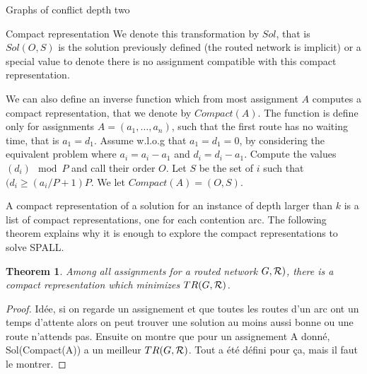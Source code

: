 \documentclass[10pt]{article}
\newtheorem{theorem}{Theorem}
\newcommand\spall{\textsc{SPALL}\xspace}
\begin{document}
\begin{section}{Graphs of conflict depth two}
\begin{subsection}{Compact representation}
We denote this transformation by $Sol$, that is $Sol(O,S)$ is the solution previously defined
(the routed network is implicit) or a special value to denote there is no assignment compatible with this compact representation. 

We can also define an inverse function which from most assignment $A$ computes a compact representation, that we denote by $Compact(A)$. The function is define only for
assignments $A = (a_1,\dots,a_n)$, such that the first route has no waiting time, that is $a_1 = d_1$. Assume w.l.o.g that $a_1 = d_1 = 0$, by considering the equivalent problem where $a_i= a_i -a_1$ and $d_i = d_i - a_1$.
Compute the values $(d_i)\mod P$ and  call their order $O$. Let 
 $S$ be the set of $i$ such that $(d_i \geq (a_i / P + 1) P$. We let $Compact(A) = (O,S)$.


A compact representation of a solution for an instance of depth larger than $k$
is a list of compact representations, one for each contention arc. The following theorem explains why it is enough to explore the compact representations to solve \spall.

\begin{theorem}
Among all assignments for a routed network $G,{\cal R})$, there is a compact representation which minimizes $TR(G,{\cal R})$.
\end{theorem}
\begin{proof}
Idée, si on regarde un assignement et que toutes les routes d'un arc ont 
un temps d'attente alors on peut trouver une solution au moins aussi bonne ou 
une route n'attends pas. Ensuite on montre que pour un assignement A donné, 
Sol(Compact(A)) a un meilleur $TR(G,{\cal R})$. Tout a été défini pour ça, mais il faut le montrer.

\end{proof}
\end{subsection}


\end{section}
	 



\end{document}
